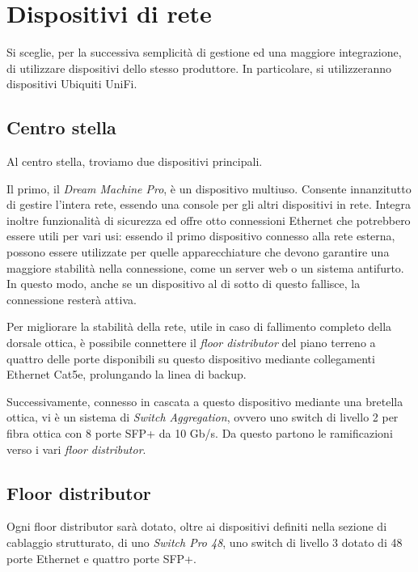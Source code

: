 
\section{Dispositivi di rete}
Si sceglie, per la successiva semplicità di gestione ed una maggiore integrazione, di utilizzare dispositivi dello
stesso produttore. In particolare, si utilizzeranno dispositivi Ubiquiti UniFi.

\subsection{Centro stella}
Al centro stella, troviamo due dispositivi principali.

Il primo, il \textit{Dream Machine Pro}, è un dispositivo multiuso. Consente innanzitutto di gestire
l'intera rete, essendo una console per gli altri dispositivi in rete. Integra inoltre funzionalità di sicurezza
ed offre otto connessioni Ethernet che potrebbero essere utili per vari usi: essendo il primo dispositivo connesso
alla rete esterna, possono essere utilizzate per quelle apparecchiature che devono garantire una maggiore stabilità
nella connessione, come un server web o un sistema antifurto. In questo modo, anche se un dispositivo al di sotto
di questo fallisce, la connessione resterà attiva.

Per migliorare la stabilità della rete, utile in caso di fallimento completo della dorsale ottica, è possibile connettere
il \textit{floor distributor} del piano terreno a quattro delle porte disponibili su questo dispositivo mediante
collegamenti Ethernet Cat5e, prolungando la linea di backup.

Successivamente, connesso in cascata a questo dispositivo mediante una bretella ottica, vi è un sistema di \textit{Switch Aggregation},
ovvero uno switch di livello 2 per fibra ottica con 8 porte SFP+ da 10 Gb/s. Da questo partono le ramificazioni verso i vari \textit{floor
  distributor}.

\subsection{Floor distributor}
Ogni floor distributor sarà dotato, oltre ai dispositivi definiti nella sezione di cablaggio strutturato,
di uno \textit{Switch Pro 48}, uno switch di livello 3 dotato di 48 porte Ethernet e quattro porte SFP+.

